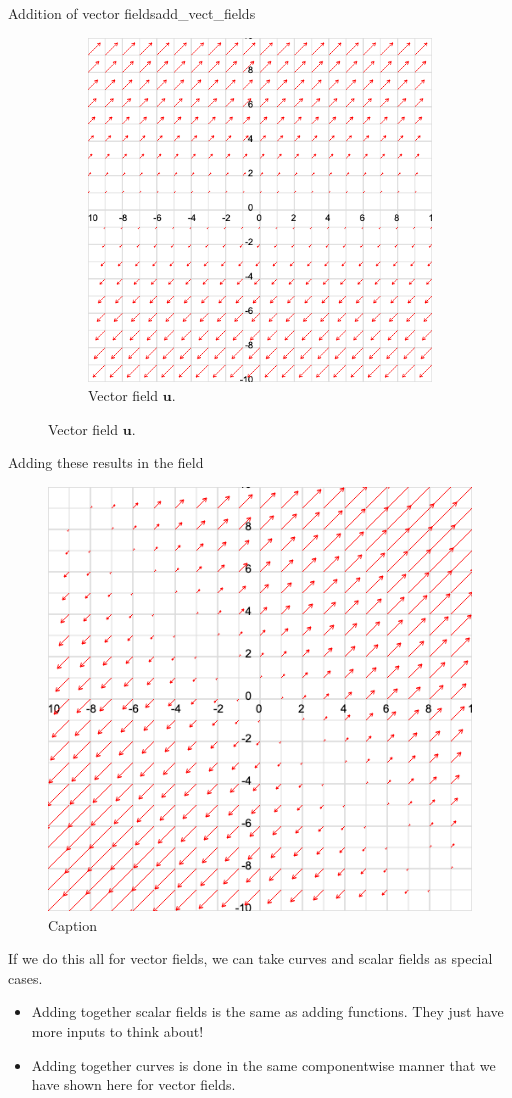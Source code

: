 \begin{ex}{Addition of vector fields}{add_vect_fields}
\begin{figure}[H]
\begin{subfigure}[h]{.45\textwidth}
            \includegraphics[width=\textwidth]{Figures/vec_u.png}
            \caption{Vector field $\mathbf{u}$.}
            \end{subfigure}
        \end{figure}
        Adding these results in the field
        \begin{figure}[h]
            \centering
            \includegraphics[width=.45\textwidth]{Figures/v_field_1.png}
            \caption{Caption}
            \label{fig:my_label}
        \end{figure}
        \end{ex}
        
        \begin{remark}
        If we do this all for vector fields, we can take curves and scalar fields as special cases.
        \begin{itemize}
            \item Adding together scalar fields is the same as adding functions.  They just have more inputs to think about!
            \item Adding together curves is done in the same componentwise manner that we have shown here for vector fields.
        \end{itemize}
        \end{remark}
        
